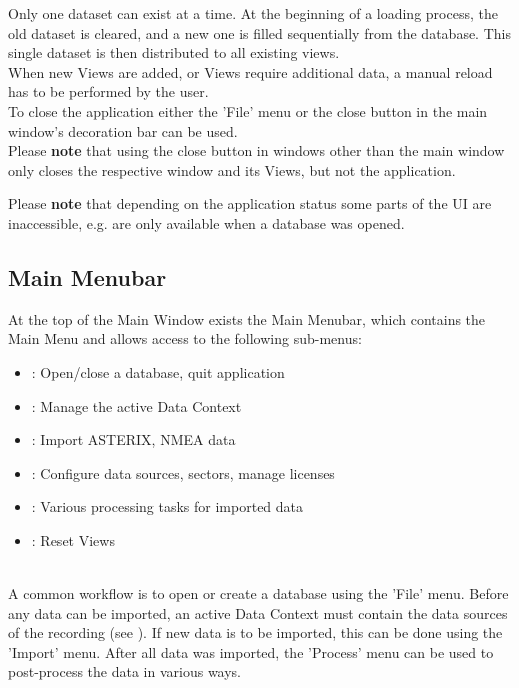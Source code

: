 Only one dataset can exist at a time. At the beginning of a loading process, the old dataset is cleared, and a new one is filled sequentially from the database. 
This single dataset is then distributed to all existing views. \\

When new Views are added, or Views require additional data, a manual reload has to be performed by the user. \\

To close the application either the 'File' menu or the close button in the main window's decoration bar can be used. \\

Please \textbf{note} that using the close button in windows other than the main window only closes the respective window and its Views, but not the application.

Please \textbf{note} that depending on the application status some parts of the UI are inaccessible, e.g. are only available when a database was opened.

\subsection{Main Menubar}
\label{sec:ui_main_menu_bar}

At the top of the Main Window exists the Main Menubar, which contains the Main Menu and allows access to the following sub-menus: 

\begin{itemize}
 \item {}: Open/close a database, quit application
 \item {}: Manage the active Data Context
 \item {}: Import ASTERIX, NMEA data
 \item {}: Configure data sources, sectors, manage licenses
 \item {}: Various processing tasks for imported data
 \item {}: Reset Views
\end{itemize} 
\  \\

A common workflow is to open or create a database using the 'File' menu. Before any data can be imported, an active Data Context must contain the data sources of the recording (see ). If new data is to be imported, this can be done using the 'Import' menu. After all data was imported, the 'Process' menu can be used to post-process the data in various ways. \\

